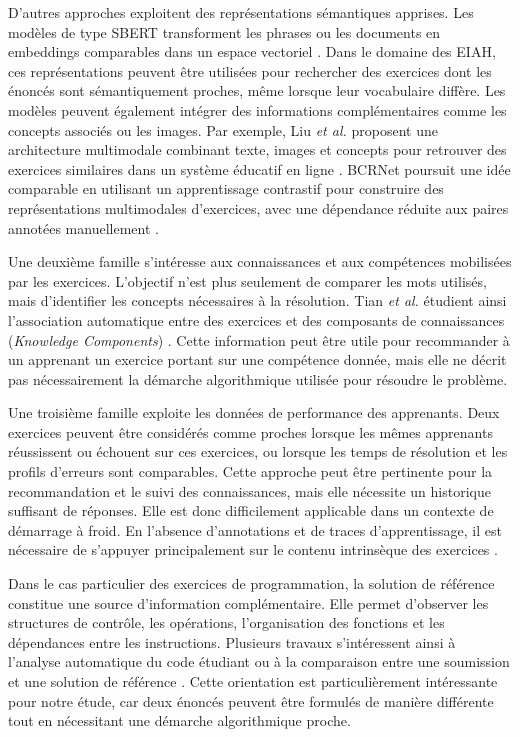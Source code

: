 D'autres approches exploitent des représentations sémantiques apprises. Les modèles de type 
SBERT transforment les phrases ou les documents en embeddings comparables dans un espace vectoriel \cite{reimers_sentence-bert_2019}. Dans le domaine des EIAH, ces représentations peuvent être utilisées pour rechercher des exercices dont les énoncés sont sémantiquement proches, même lorsque leur vocabulaire diffère. Les modèles peuvent également intégrer des informations complémentaires comme les concepts associés ou les images. Par exemple, Liu \emph{et al.} proposent une architecture multimodale combinant texte, images et concepts pour retrouver des exercices similaires dans un système éducatif en ligne \cite{liu_finding_2018}. BCRNet poursuit une idée comparable en utilisant un apprentissage contrastif pour construire des représentations multimodales d'exercices, avec une dépendance réduite aux paires annotées manuellement \cite{mu_bcrnet_2023}.

Une deuxième famille s'intéresse aux connaissances et aux compétences mobilisées par les 
exercices. L'objectif n'est plus seulement de comparer les mots utilisés, mais d'identifier 
les concepts nécessaires à la résolution. Tian \emph{et al.} étudient ainsi l'association 
automatique entre des exercices et des composants de connaissances (\emph{Knowledge Components}) \cite{tian_automated_2022}. 
Cette information peut être utile pour recommander à un apprenant un exercice portant sur une 
compétence donnée, mais elle ne décrit pas nécessairement la démarche algorithmique utilisée 
pour résoudre le problème.

Une troisième famille exploite les données de performance des apprenants. Deux exercices 
peuvent être considérés comme proches lorsque les mêmes apprenants réussissent ou échouent 
sur ces exercices, ou lorsque les temps de résolution et les profils d'erreurs sont comparables.
 Cette approche peut être pertinente pour la recommandation et le suivi des connaissances, mais
  elle nécessite un historique suffisant de réponses. Elle est donc difficilement applicable dans
   un contexte de démarrage à froid. En l'absence d'annotations et de traces d'apprentissage, il 
   est nécessaire de s'appuyer principalement sur le contenu intrinsèque des exercices \cite{pelanek_measuring_2020}.

Dans le cas particulier des exercices de programmation, la solution de référence constitue une
 source d'information complémentaire. Elle permet d'observer les structures de contrôle, les 
 opérations, l'organisation des fonctions et les dépendances entre les instructions. Plusieurs
  travaux s'intéressent ainsi à l'analyse automatique du code étudiant ou à la comparaison entre
   une soumission et une solution de référence \cite{vujosevic-janicic_software_2013,xiang_graph_2024}. 
   Cette orientation est particulièrement intéressante pour notre étude, car deux énoncés peuvent
    être formulés de manière différente tout en nécessitant une démarche algorithmique proche.


